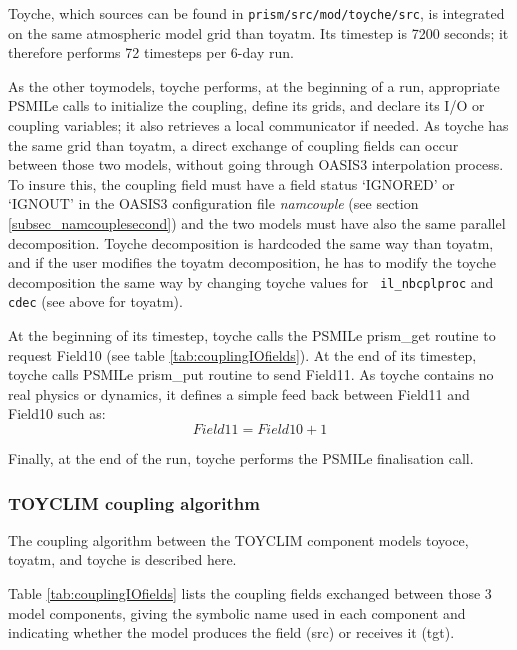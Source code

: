 Toyche, which sources can be found in {\tt prism/src/mod/toyche/src},
is integrated on the same atmospheric model grid than toyatm. Its
timestep is 7200 seconds; it therefore performs 72 timesteps per 6-day
run.

As the other toymodels, toyche performs, at the beginning of a run,
appropriate PSMILe calls to initialize the coupling, define its grids,
and declare its I/O or coupling variables; it also retrieves a local
communicator if needed. As toyche has the same grid than toyatm, a direct
exchange of coupling fields can occur between those two models,
without going through OASIS3 interpolation process. To insure this,
the coupling field must have a field status `IGNORED' or `IGNOUT' in
the OASIS3 configuration file {\it namcouple} (see section
\ref{subsec_namcouplesecond}) and the two models must have also the same
parallel decomposition.  Toyche decomposition is hardcoded the same way
than toyatm, and if the user modifies the toyatm decomposition, he has to
modify the toyche decomposition the same way by changing toyche values for {\tt
il\_nbcplproc} and {\tt cdec} (see above for toyatm).

At the beginning of its timestep, toyche calls the PSMILe prism\_get
routine to request Field10 (see table \ref{tab:couplingIOfields}). At
the end of its timestep, toyche calls PSMILe prism\_put routine to send
Field11. As toyche contains no real physics or dynamics, it defines a
simple feed back between Field11 and Field10 such as:
$$ Field11 = Field10 + 1 $$

Finally, at the end of the run, toyche performs the PSMILe finalisation call.

\subsubsection{TOYCLIM coupling algorithm}

 The coupling algorithm between the TOYCLIM component models toyoce, toyatm,
 and toyche is described here.
 
Table \ref{tab:couplingIOfields} lists the coupling fields exchanged
between those 3 model components, giving the symbolic name used in
each component and indicating whether the model produces the field
(src) or receives it (tgt).
 
